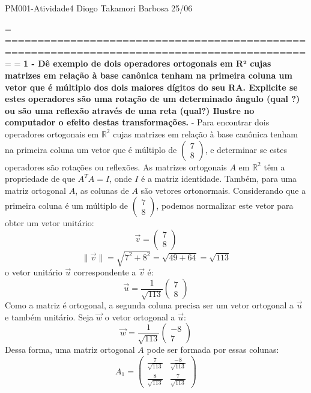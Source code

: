 
PM001-Atividade4
Diogo Takamori Barbosa
25/06

=
=============================================================================================
=
\textbf{1 - Dê exemplo de dois operadores ortogonais em R² cujas matrizes em relação à base canônica tenham na primeira coluna um vetor que é múltiplo dos dois maiores dígitos do seu RA. Explicite se estes operadores são uma rotação de um determinado ângulo (qual ?) ou são uma reflexão através de uma reta (qual?) Ilustre no computador o efeito destas transformações.}
-
Para encontrar dois operadores ortogonais em \(\mathbb{R}^2\) cujas matrizes em relação à base canônica tenham na primeira coluna um vetor que é múltiplo de \(\begin{pmatrix} 7 \\ 8 \end{pmatrix}\), e determinar se estes operadores são rotações ou reflexões.
As matrizes ortogonais \(A\) em \(\mathbb{R}^2\) têm a propriedade de que \(A^TA = I\), onde \(I\) é a matriz identidade. Também, para uma matriz ortogonal \(A\), as colunas de \(A\) são vetores ortonormais. 
Considerando que a primeira coluna é um múltiplo de \(\begin{pmatrix} 7 \\ 8 \end{pmatrix}\), podemos normalizar este vetor para obter um vetor unitário:
\[
   \vec{v} = \begin{pmatrix} 7 \\ 8 \end{pmatrix}
\]\[
   \|\vec{v}\| = \sqrt{7^2 + 8^2} = \sqrt{49 + 64} = \sqrt{113}
\]
o vetor unitário \(\vec{u}\) correspondente a \(\vec{v}\) é:
\[
   \vec{u} = \frac{1}{\sqrt{113}} \begin{pmatrix} 7 \\ 8 \end{pmatrix}
\]
Como a matriz é ortogonal, a segunda coluna precisa ser um vetor ortogonal a \(\vec{u}\) e também unitário. Seja \(\vec{w}\) o vetor ortogonal a \(\vec{u}\):
   \[
   \vec{w} = \frac{1}{\sqrt{113}} \begin{pmatrix} -8 \\ 7 \end{pmatrix}
   \]
Dessa forma, uma matriz ortogonal \(A\) pode ser formada por essas colunas:
\[
A_1 = \left(\begin{array}{cc} \frac{7}{\sqrt{113}} & \frac{-8}{\sqrt{113}} \\ \frac{8}{\sqrt{113}} & \frac{7}{\sqrt{113}} \end{array}\right)
\]
